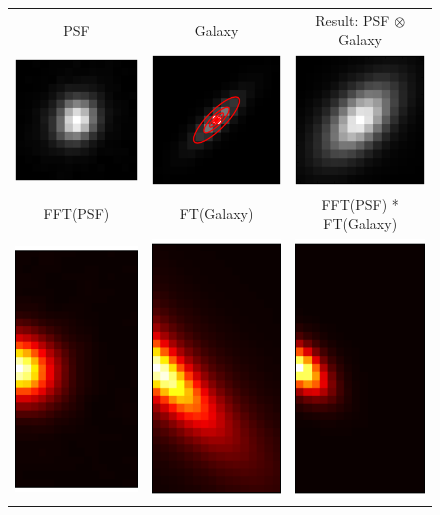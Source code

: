 \documentclass[11pt,preprint]{aastex}
\newcommand{\conv}{\otimes}
\begin{document}
\begin{figure}
  \begin{center}
    \begin{tabular}{@{}c@{}c@{}c@{}}
      PSF & Galaxy & Result: PSF $\conv$ Galaxy \\
      \includegraphics[height=0.22\textwidth]{psf-09} &
      \includegraphics[height=0.22\textwidth]{psf-13} &
      \includegraphics[height=0.22\textwidth]{psf-14} \\
      FFT(PSF) & FT(Galaxy) & FFT(PSF) * FT(Galaxy) \\
      \multicolumn{1}{r}{%
        \includegraphics[height=0.22\textwidth]{psf-10}} &
      \multicolumn{1}{r}{%
        \includegraphics[height=0.22\textwidth]{psf-11}} &
      \multicolumn{1}{r}{%
        \includegraphics[height=0.22\textwidth]{psf-12}}

\end{tabular}
\end{center}
\end{figure}
\end{document}

